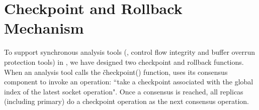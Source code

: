 

% 
% 



\section{Checkpoint and Rollback Mechanism} \label{sec:checkpoint}

To support synchronous analysis tools (\eg, control flow integrity and buffer 
overrun protection tools) in \xxx, we have designed two checkpoint and rollback 
functions. When an analysis tool calls the \v{checkpoint()} function, \xxx uses 
its \paxos consensus component to invoke an operation: ``take a checkpoint 
associated with the global index of the latest socket operation". Once a 
consensus is reached, all replicas (including primary) do a checkpoint 
operation as the next consensus operation.


